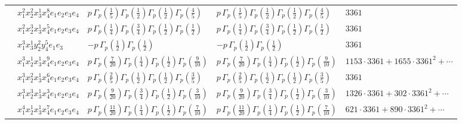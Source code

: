 \documentclass[11pt]{article}
\begin{document}
\begin{table}[ht]
{\begin{tabular}{@{}lllll@{}}
 & $x_{1}^{2} x_{2}^{2} x_{3}^{1} x_{4}^{8}  e_{1} e_{2} e_{3} e_{4}$ & $p \, \Gamma_p \left( \frac{1}{5} \right) \Gamma_p \left( \frac{1}{2} \right) \Gamma_p \left( \frac{1}{2} \right) \Gamma_p \left( \frac{4}{5} \right)$ & $p \, \Gamma_p \left( \frac{1}{5} \right) \Gamma_p \left( \frac{1}{2} \right) \Gamma_p \left( \frac{1}{2} \right) \Gamma_p \left( \frac{4}{5} \right)$ & $3361$ \\
 & $x_{1}^{2} x_{2}^{3} x_{3}^{1} x_{4}^{5}  e_{1} e_{2} e_{3} e_{4}$ & $p \, \Gamma_p \left( \frac{1}{4} \right) \Gamma_p \left( \frac{3}{4} \right) \Gamma_p \left( \frac{1}{2} \right) \Gamma_p \left( \frac{1}{2} \right)$ & $p \, \Gamma_p \left( \frac{1}{4} \right) \Gamma_p \left( \frac{3}{4} \right) \Gamma_p \left( \frac{1}{2} \right) \Gamma_p \left( \frac{1}{2} \right)$ & $3361$ \\
 & $x_{1}^{3} x_{3}^{1} y_{2}^{2} y_{4}^{5} e_{1} e_{3}$ & $- p \, \Gamma_p \left( \frac{1}{2} \right) \Gamma_p \left( \frac{1}{2} \right)$ & $- p \, \Gamma_p \left( \frac{1}{2} \right) \Gamma_p \left( \frac{1}{2} \right)$ & $3361$ \\
 & $x_{1}^{3} x_{2}^{1} x_{3}^{1} x_{4}^{9}  e_{1} e_{2} e_{3} e_{4}$ & $p \, \Gamma_p \left( \frac{7}{20} \right) \Gamma_p \left( \frac{1}{4} \right) \Gamma_p \left( \frac{1}{2} \right) \Gamma_p \left( \frac{9}{10} \right)$ & $p \, \Gamma_p \left( \frac{7}{20} \right) \Gamma_p \left( \frac{1}{4} \right) \Gamma_p \left( \frac{1}{2} \right) \Gamma_p \left( \frac{9}{10} \right)$ & $1153{\cdot}3361{+}1655{\cdot}3361^{2}{+}\cdots$ \\
 & $x_{1}^{3} x_{2}^{2} x_{3}^{1} x_{4}^{6}  e_{1} e_{2} e_{3} e_{4}$ & $p \, \Gamma_p \left( \frac{2}{5} \right) \Gamma_p \left( \frac{1}{2} \right) \Gamma_p \left( \frac{1}{2} \right) \Gamma_p \left( \frac{3}{5} \right)$ & $p \, \Gamma_p \left( \frac{2}{5} \right) \Gamma_p \left( \frac{1}{2} \right) \Gamma_p \left( \frac{1}{2} \right) \Gamma_p \left( \frac{3}{5} \right)$ & $3361$ \\
 & $x_{1}^{3} x_{2}^{3} x_{3}^{1} x_{4}^{3}  e_{1} e_{2} e_{3} e_{4}$ & $p \, \Gamma_p \left( \frac{9}{20} \right) \Gamma_p \left( \frac{3}{4} \right) \Gamma_p \left( \frac{1}{2} \right) \Gamma_p \left( \frac{3}{10} \right)$ & $p \, \Gamma_p \left( \frac{9}{20} \right) \Gamma_p \left( \frac{3}{4} \right) \Gamma_p \left( \frac{1}{2} \right) \Gamma_p \left( \frac{3}{10} \right)$ & $1326{\cdot}3361{+}302{\cdot}3361^{2}{+}\cdots$ \\
 & $x_{1}^{4} x_{2}^{1} x_{3}^{1} x_{4}^{7}  e_{1} e_{2} e_{3} e_{4}$ & $p \, \Gamma_p \left( \frac{11}{20} \right) \Gamma_p \left( \frac{1}{4} \right) \Gamma_p \left( \frac{1}{2} \right) \Gamma_p \left( \frac{7}{10} \right)$ & $p \, \Gamma_p \left( \frac{11}{20} \right) \Gamma_p \left( \frac{1}{4} \right) \Gamma_p \left( \frac{1}{2} \right) \Gamma_p \left( \frac{7}{10} \right)$ & $621{\cdot}3361{+}890{\cdot}3361^{2}{+}\cdots$ \\

\end{tabular}}
\end{table}
\end{document}
